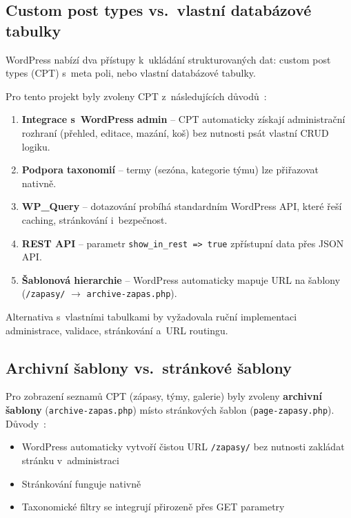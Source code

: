\documentclass[12pt,a4paper]{article}
\begin{document}
\subsection{Custom post types vs.\ vlastní databázové tabulky}

WordPress nabízí dva přístupy k~ukládání strukturovaných dat: custom post types (CPT) s~meta poli, nebo vlastní databázové tabulky.

Pro tento projekt byly zvoleny CPT z~následujících důvodů~\cite{wpdev}:

\begin{enumerate}
    \item \textbf{Integrace s~WordPress admin} -- CPT automaticky získají administrační rozhraní (přehled, editace, mazání, koš) bez nutnosti psát vlastní CRUD logiku.
    \item \textbf{Podpora taxonomií} -- termy (sezóna, kategorie týmu) lze přiřazovat nativně.
    \item \textbf{WP\_Query} -- dotazování probíhá standardním WordPress API, které řeší caching, stránkování i~bezpečnost.
    \item \textbf{REST API} -- parametr \texttt{show\_in\_rest => true} zpřístupní data přes JSON API.
    \item \textbf{Šablonová hierarchie} -- WordPress automaticky mapuje URL na šablony (\texttt{/zapasy/} $\rightarrow$ \texttt{archive-zapas.php}).
\end{enumerate}

Alternativa s~vlastními tabulkami by vyžadovala ruční implementaci administrace, validace, stránkování a~URL routingu.

\subsection{Archivní šablony vs.\ stránkové šablony}

Pro zobrazení seznamů CPT (zápasy, týmy, galerie) byly zvoleny \textbf{archivní šablony} (\texttt{archive-zapas.php}) místo stránkových šablon (\texttt{page-zapasy.php}). Důvody~\cite{wpdev}:

\begin{itemize}
    \item WordPress automaticky vytvoří čistou URL \texttt{/zapasy/} bez nutnosti zakládat stránku v~administraci
    \item Stránkování funguje nativně
    \item Taxonomické filtry se integrují přirozeně přes GET parametry
\end{itemize}
\end{document}
